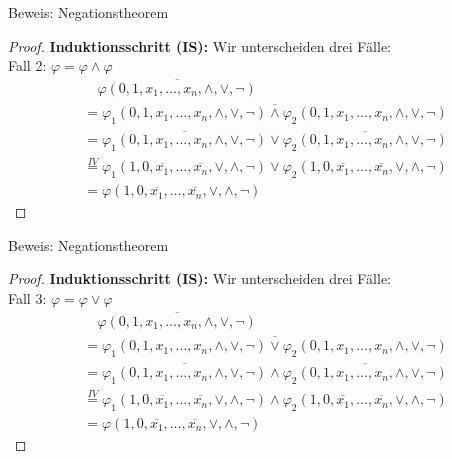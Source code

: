 \documentclass[12pt%
,aspectratio=169%
]{beamer}
\begin{document}
\begin{frame}{Beweis: Negationstheorem}
\begin{proof}
\textbf{Induktionsschritt (IS):} Wir unterscheiden drei Fälle:\\
Fall 2: $\varphi = \varphi \land \varphi$
\begin{align*}
&\quad \overline{\varphi(0, 1, x_1 , \ldots , x_n , \land, \lor, \neg)}\\
&= \overline{\varphi_1(0, 1, x_1 , \ldots , x_n , \land, \lor, \neg) \land \varphi_2(0, 1, x_1 , \ldots , x_n , \land, \lor, \neg)}\\
&= \overline{\varphi_1(0, 1, x_1 , \ldots , x_n , \land, \lor, \neg)} \lor \overline{\varphi_2(0, 1, x_1 , \ldots , x_n , \land, \lor, \neg)}\\
&\overset{IV}= \varphi_1(1, 0, \overline{x_1} , \ldots ,\overline{x_n} , \lor, \land, \neg) \lor \varphi_2(1, 0, \overline{x_1} , \ldots ,\overline{x_n} , \lor, \land, \neg)\\
&= \varphi(1, 0, \overline{x_1} , \ldots ,\overline{x_n} , \lor, \land, \neg)
\end{align*}
\end{proof}
\end{frame}

\begin{frame}{Beweis: Negationstheorem}
\begin{proof}
\textbf{Induktionsschritt (IS):} Wir unterscheiden drei Fälle:\\
Fall 3: $\varphi = \varphi \lor \varphi$
\begin{align*}
&\quad \overline{\varphi(0, 1, x_1 , \ldots , x_n , \land, \lor, \neg)}\\
&= \overline{\varphi_1(0, 1, x_1 , \ldots , x_n , \land, \lor, \neg) \lor \varphi_2(0, 1, x_1 , \ldots , x_n , \land, \lor, \neg)}\\
&= \overline{\varphi_1(0, 1, x_1 , \ldots , x_n , \land, \lor, \neg)} \land \overline{\varphi_2(0, 1, x_1 , \ldots , x_n , \land, \lor, \neg)}\\
&\overset{IV}= \varphi_1(1, 0, \overline{x_1} , \ldots ,\overline{x_n} , \lor, \land, \neg) \land \varphi_2(1, 0, \overline{x_1} , \ldots ,\overline{x_n} , \lor, \land, \neg)\\
&= \varphi(1, 0, \overline{x_1} , \ldots ,\overline{x_n} , \lor, \land, \neg)
\end{align*}
\end{proof}
\end{frame}
\end{document}
